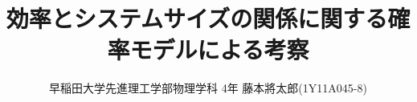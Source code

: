 \documentclass[a4j,11pt,onecolumn,oneside,openany]{jsbook}
\title{効率とシステムサイズの関係に関する確率モデルによる考察}
\author{早稲田大学先進理工学部物理学科 4年 藤本將太郎(1Y11A045-8)}
\begin{document}
\begin{titlepage}
\maketitle
\thispagestyle{empty}
\end{titlepage}
\newpage
{}
\begin{abstract}

\end{abstract}
\newpage
\tableofcontents
\newpage
{}





\end{document}
